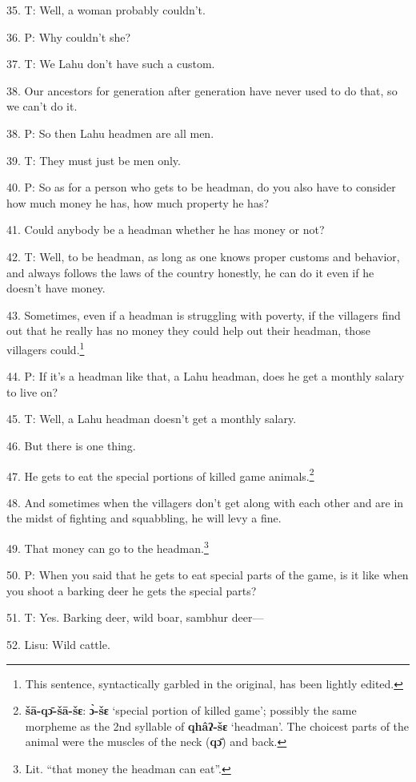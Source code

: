 35. T: Well, a woman probably couldn't.

36. P: Why couldn't she?

37. T: We Lahu don't have such a custom.

38. Our ancestors for generation after generation have never used to do that, so
we can't do it.

38. P: So then Lahu headmen are all men.

39. T: They must just be men only.

40. P: So as for a person who gets to be headman, do you also have to consider
how much money he has, how much property he has?

41. Could anybody be a headman whether he has money or not?

42. T: Well, to be headman, as long as one knows proper customs and behavior, and
always follows the laws of the country honestly, he can do it even if he doesn't
have money.

43. Sometimes, even if a headman is struggling with poverty, if the villagers find
out that he really has no money they could help out their headman, those villagers
could.\footnote{This sentence, syntactically garbled in the original, has been lightly edited.}

44. P: If it's a headman like that, a Lahu headman, does he get a monthly salary
to live on?

45. T: Well, a Lahu headman doesn't get a monthly salary.

46. But there is one thing.

47. He gets to eat the special portions of killed game animals.\footnote{\textbf{šā-qɔ̄-šā-šɛ}: \textbf{ɔ̀-šɛ} `special portion of killed game'; possibly the same morpheme as the 2nd syllable of \textbf{qhâʔ-šɛ} `headman'. The choicest parts of the animal were the muscles of the neck (\textbf{qɔ̄}) and back.}

48. And sometimes when the villagers don't get along with each other and are in
the midst of fighting and squabbling, he will levy a fine.

49. That money can go to the headman.\footnote{Lit. ``that money the headman can eat''.}

50. P: When you said that he gets to eat special parts of the game, is it like
when you shoot a barking deer he gets the special parts?

51. T: Yes. Barking deer, wild boar, sambhur deer---

52. Lisu: Wild cattle.

